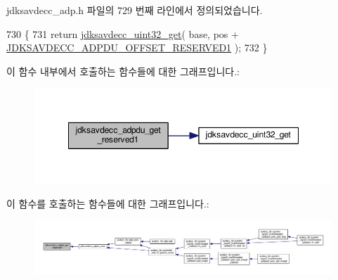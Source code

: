 jdksavdecc\+\_\+adp.\+h 파일의 729 번째 라인에서 정의되었습니다.


\begin{DoxyCode}
730 \{
731     \textcolor{keywordflow}{return} \hyperlink{group__endian_gaefcf5bd4f368997a82f358ab89052d6b}{jdksavdecc\_uint32\_get}( base, pos + 
      \hyperlink{group__adpdu_ga96ee13854c7f3a94f95dcc72d102e17b}{JDKSAVDECC\_ADPDU\_OFFSET\_RESERVED1} );
732 \}
\end{DoxyCode}


이 함수 내부에서 호출하는 함수들에 대한 그래프입니다.\+:
\nopagebreak
\begin{figure}[H]
\begin{center}
\leavevmode
\includegraphics[width=348pt]{group__adpdu_ga855228a4d0b00d861cc77b79afa6f52b_cgraph}
\end{center}
\end{figure}




이 함수를 호출하는 함수들에 대한 그래프입니다.\+:
\nopagebreak
\begin{figure}[H]
\begin{center}
\leavevmode
\includegraphics[width=350pt]{group__adpdu_ga855228a4d0b00d861cc77b79afa6f52b_icgraph}
\end{center}
\end{figure}


